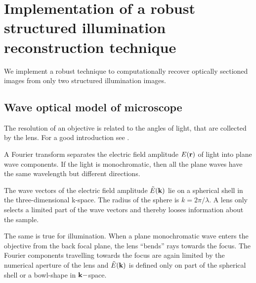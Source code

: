 

\newcommand{\avg}[1]{\langle #1 \rangle}

\chapter{Implementation of a robust structured illumination
  reconstruction technique}
\label{sec:app_hilo}
\begin{summary}
  We implement a robust technique to computationally recover optically
  sectioned images from only two structured illumination images.
\end{summary}
\section{Wave optical model of microscope}
The resolution of an objective is related to the angles of light, that
are collected by the lens. For a good introduction see
\citet{Gustafsson1995}.

A Fourier transform separates the electric field amplitude $E(\mathbf{r})$ of
light into plane wave components. If the light is monochromatic, then
all the plane waves have the same wavelength but different directions.

The wave vectors of the electric field amplitude $\tilde E(\mathbf{k})$ lie on
a spherical shell in the three-dimensional k-space. The radius of the
sphere is $k=2\pi/\lambda$. A lens only selects a limited part of the
wave vectors and thereby looses information about the sample.

The same is true for illumination. When a plane monochromatic wave
enters the objective from the back focal plane, the lens ``bends''
rays towards the focus. The Fourier components travelling towards the
focus are again limited by the numerical aperture of the lens and
$\tilde E(\mathbf{k})$ is defined only on part of the spherical shell or a
bowl-shape in $\mathbf{k}-$space.

